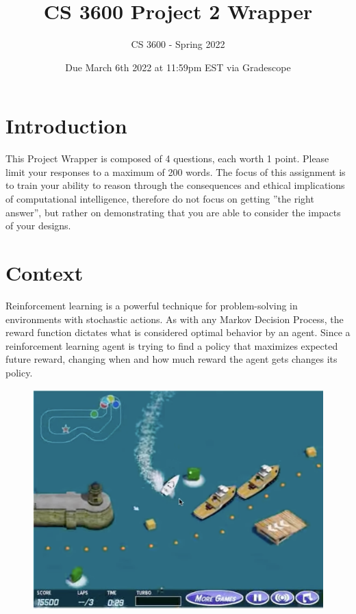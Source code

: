 \documentclass[12pt]{extarticle}
\title{CS 3600 Project 2 Wrapper}
\author{CS 3600 - Spring 2022}
\date{Due March 6th 2022 at 11:59pm EST via Gradescope}
\begin{document}
\maketitle

\section*{Introduction}

This Project Wrapper is composed of 4 questions, each worth 1 point. Please
limit your responses to a maximum of 200 words. The focus of this assignment is to train your ability to reason through the consequences and ethical implications of computational intelligence, therefore do not focus on getting ”the right answer”, but rather on demonstrating that you are able to consider the impacts of your designs.

\section*{Context}

Reinforcement learning is a powerful technique for problem-solving in environments with stochastic actions. As with any Markov Decision Process, the reward function dictates what is considered optimal behavior by an agent. Since a reinforcement learning agent is trying to find a policy that maximizes expected future reward, changing when and how much reward the agent gets changes its policy. \\

\newpage

\begin{figure}
    \centering
    \includegraphics[width=\textwidth]{img/P2WrapperBoat.png}
\end{figure}
\end{document}
